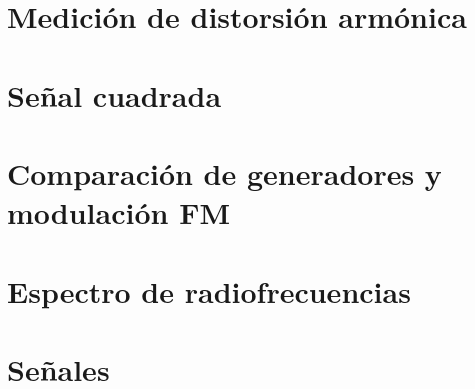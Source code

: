 







\tableofcontents
\newpage


\section{Medición de distorsión armónica}
	
	
\section{Señal cuadrada}
	
	
\section{Comparación de generadores y modulación FM}
	
	
\section{Espectro de radiofrecuencias}
	

\section{Señales}
	

